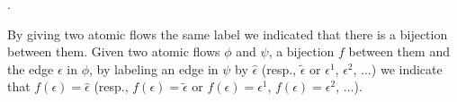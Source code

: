 


.


\begin{definition}
By giving two atomic flows the same label we indicated that there is a bijection between them.
Given two atomic flows $\phi$ and $\psi$, a bijection $f$ between them and the edge $\epsilon$ in $\phi$, by labeling an edge in $\psi$ by $\hat\epsilon$ (resp., $\tilde\epsilon$ or $\epsilon^1$, $\epsilon^2$, $\dots$) we indicate that $f(\epsilon)=\hat\epsilon$ (resp., $f(\epsilon)=\tilde\epsilon$ or $f(\epsilon)=\epsilon^1$, $f(\epsilon)=\epsilon^2$, $\dots$).
\end{definition}

